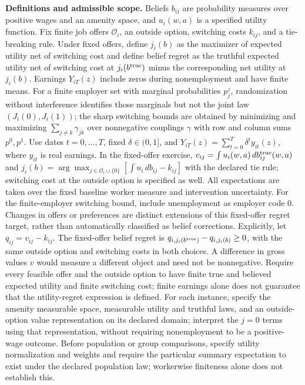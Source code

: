 \documentclass[11pt,a4paper]{article}
\begin{document}
\textbf{Definitions and admissible scope.} Beliefs \(b_{ij}\) are probability measures over positive wages and an amenity space, and \(u_i(w,a)\) is a specified utility function. Fix finite job offers \(\mathcal O_i\), an outside option, switching costs \(k_{ij}\), and a tie-breaking rule. Under fixed offers, define \(j_i(b)\) as the maximizer of expected utility net of switching cost and define belief regret as the truthful expected utility net of switching cost at \(j_i(b^{\rm true})\) minus the corresponding net utility at \(j_i(b)\). Earnings \(Y_{iT}(z)\) include zeros during nonemployment and have finite means. For a finite employer set with marginal probabilities \(p_j^z\), randomization without interference identifies those marginals but not the joint law \((J_i(0),J_i(1))\); the sharp switching bounds are obtained by minimizing and maximizing \(\sum_{j\ne k}\gamma_{jk}\) over nonnegative couplings \(\gamma\) with row and column sums \(p^0,p^1\). Use dates \(t=0,\ldots,T\), fixed \(\delta\in(0,1]\), and \(Y_{iT}(z)=\sum_{t=0}^T\delta^t y_{it}(z)\), where \(y_{it}\) is real earnings. In the fixed-offer exercise, \(v_{ij}=\int u_i(w,a)\,db_{ij}^{\rm true}(w,a)\) and \(j_i(b)=\arg\max_{j\in\mathcal O_i\cup\{0\}}[\int u_i\,db_{ij}-k_{ij}]\) with the declared tie rule; switching cost at the outside option is specified as well. All expectations are taken over the fixed baseline worker measure and intervention uncertainty. For the finite-employer switching bound, include unemployment as employer code 0. Changes in offers or preferences are distinct extensions of this fixed-offer regret target, rather than automatically classified as belief corrections. Explicitly, let \(q_{ij}=v_{ij}-k_{ij}\). The fixed-offer belief regret is \(q_{i,j_i(b^{\rm true})}-q_{i,j_i(b)}\ge0\), with the same outside option and switching costs in both choices. A difference in gross values \(v\) would measure a different object and need not be nonnegative. Require every feasible offer and the outside option to have finite true and believed expected utility and finite switching cost; finite earnings alone does not guarantee that the utility-regret expression is defined. For each instance, specify the amenity measurable space, measurable utility and truthful laws, and an outside-option value representation on its declared domain; interpret the \(j=0\) terms using that representation, without requiring nonemployment to be a positive-wage outcome. Before population or group comparisons, specify utility normalization and weights and require the particular summary expectation to exist under the declared population law; workerwise finiteness alone does not establish this.
\end{document}
